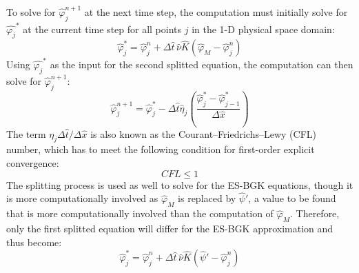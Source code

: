\documentclass[a4paper]{article}
\begin{document}
To solve for $\hat{\varphi}^{n+1}_j$ at the next time step,  the computation must initially solve for $\hat{\varphi_j}^*$ at the current time step for all points $j$ in the 1-D physical space domain:
\begin{equation}
    \hat{\varphi}^{*}_j = \hat{\varphi}^{n}_j + \Delta\hat{t} \, \hat{\nu} \hat{K}(\hat{\varphi}_M - \hat{\varphi}^n_j) 
\end{equation}
Using $\hat{\varphi_j}^*$ as the input for the second splitted equation, the computation can then solve for $\hat{\varphi}^{n+1}_j$:
\begin{equation}
    \hat{\varphi}^{n+1}_j = \hat{\varphi}^{*}_j - {\Delta \hat{t}}\hat{\eta}_j \left(\dfrac{\hat{\varphi}^*_{j} - \hat{\varphi}^*_{j-1}}{\Delta \hat{x}}\right)
\end{equation}
The term $\eta_j \Delta \hat{t}/\Delta \hat{x}$ is also known as the Courant–Friedrichs–Lewy (CFL) number, which has to meet the following condition for first-order explicit convergence:
\begin{equation}
    CFL \leq 1 
\end{equation}
The splitting process is used as well to solve for the ES-BGK equations, though it is more computationally involved as $\hat{\varphi}_M$ is replaced by $\hat{\psi}'$, a value to be found that is more computationally involved than the computation of $\hat{\varphi}_M$. Therefore, only the first splitted equation will differ for the ES-BGK approximation and thus become:
\begin{equation}
    \hat{\varphi}^{*}_j = \hat{\varphi}^{n}_j + \Delta\hat{t} \, \hat{\nu} \hat{K} (\hat{\psi}' - \hat{\varphi}^n_j) 
\end{equation}
\end{document}
